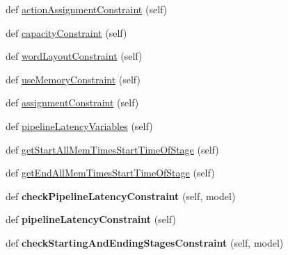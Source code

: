 \begin{DoxyCompactItemize}
\item 
def \hyperlink{classmapper_1_1src_1_1rmt_1_1orig__rmt__compiler_1_1_rmt_ilp_compiler_ace17731f6ed25fbda40a37f78b777d9f}{action\+Assignment\+Constraint} (self)
\item 
def \hyperlink{classmapper_1_1src_1_1rmt_1_1orig__rmt__compiler_1_1_rmt_ilp_compiler_a4eff57998a57301f5ad22b36d5f142a0}{capacity\+Constraint} (self)
\item 
def \hyperlink{classmapper_1_1src_1_1rmt_1_1orig__rmt__compiler_1_1_rmt_ilp_compiler_a665f12ca05865726ea920a1e22ac2f0c}{word\+Layout\+Constraint} (self)
\item 
def \hyperlink{classmapper_1_1src_1_1rmt_1_1orig__rmt__compiler_1_1_rmt_ilp_compiler_a78dbcddce66838280af30531127d0ebb}{use\+Memory\+Constraint} (self)
\item 
def \hyperlink{classmapper_1_1src_1_1rmt_1_1orig__rmt__compiler_1_1_rmt_ilp_compiler_a7590e41d99becfcbe593d490849e5c27}{assignment\+Constraint} (self)
\item 
def \hyperlink{classmapper_1_1src_1_1rmt_1_1orig__rmt__compiler_1_1_rmt_ilp_compiler_a9b9a1d7a64c2dcf0b9cad5f3b814072e}{pipeline\+Latency\+Variables} (self)
\item 
def \hyperlink{classmapper_1_1src_1_1rmt_1_1orig__rmt__compiler_1_1_rmt_ilp_compiler_a2a691d0bb9f0a39959c61e091bf2f518}{get\+Start\+All\+Mem\+Times\+Start\+Time\+Of\+Stage} (self)
\item 
def \hyperlink{classmapper_1_1src_1_1rmt_1_1orig__rmt__compiler_1_1_rmt_ilp_compiler_a5fbfdd61d8b07a0c20de62423f8afd1f}{get\+End\+All\+Mem\+Times\+Start\+Time\+Of\+Stage} (self)
\item 
\hypertarget{classmapper_1_1src_1_1rmt_1_1orig__rmt__compiler_1_1_rmt_ilp_compiler_afc18996a69e909751bd650adfccfb5d0}{}def {\bfseries check\+Pipeline\+Latency\+Constraint} (self, model)\label{classmapper_1_1src_1_1rmt_1_1orig__rmt__compiler_1_1_rmt_ilp_compiler_afc18996a69e909751bd650adfccfb5d0}

\item 
\hypertarget{classmapper_1_1src_1_1rmt_1_1orig__rmt__compiler_1_1_rmt_ilp_compiler_aa3ecc8a7de02a56e076320868bd02291}{}def {\bfseries pipeline\+Latency\+Constraint} (self)\label{classmapper_1_1src_1_1rmt_1_1orig__rmt__compiler_1_1_rmt_ilp_compiler_aa3ecc8a7de02a56e076320868bd02291}

\item 
\hypertarget{classmapper_1_1src_1_1rmt_1_1orig__rmt__compiler_1_1_rmt_ilp_compiler_ac164ac5b357799c6a5abea5ab3d1a96e}{}def {\bfseries check\+Starting\+And\+Ending\+Stages\+Constraint} (self, model)\label{classmapper_1_1src_1_1rmt_1_1orig__rmt__compiler_1_1_rmt_ilp_compiler_ac164ac5b357799c6a5abea5ab3d1a96e}


\end{DoxyCompactItemize}
